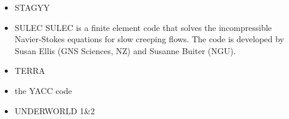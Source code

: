 \begin{itemize}
\cite{full95}
\cite{wibe94}
\cite{befh94}
\cite{full95}
\cite{elfb95}
\cite{bekh96}
\cite{will99}
\cite{pybf00}
\cite{bemh00}
\cite{bejn01}
\cite{hube02}
\cite{pybf02}
\cite{hube03}
\cite{vamf03}
\cite{wipo03}
\cite{pymi03}
\cite{bejn04}
\cite{pycr04}
\cite{pybe04}
\cite{elsp04}
\cite{geim04}
\cite{gebi05}
\cite{hubb05}
\cite{pysk06}
\cite{selz06}
\cite{hube07}
\cite{cubh07}
\cite{mohb07}
\cite{sebp08}
\cite{wabj08}
\cite{wabj08b}
\cite{kecw09}
\cite{bejb09}
\cite{bupb09}
\cite{grba09}
\cite{sihb09}
\cite{albs10}
\cite{albe10}
\cite{grpy10}
\cite{pygp10}
\cite{cube11}
\cite{bubj11}
\cite{hube11}
\cite{grpy12}
\cite{grpy12b}
\cite{kogp12}
\cite{grbe12}
\cite{jahu12}
\cite{bubj13}
\cite{chbe13}
\cite{fihv13a}
\cite{fihv13b}
\cite{gobi13}
\cite{grpy13}
\cite{knak13}
\cite{nipc13}
\cite{jahm13}
\cite{gogu14}
\cite{albe15}
\cite{bubj15}
\cite{heps15}
\cite{licu16}
\cite{bube17}


\item STAGYY
\cite{rota11}
\cite{yadl14}
\cite{crta14}

\item SULEC
SULEC is a finite element code that solves the incompressible Navier-Stokes equations 
for slow creeping flows. The code is developed by Susan Ellis 
(GNS Sciences, NZ) and Susanne Buiter (NGU). 

\cite{qube11}
\cite{ellw11}
\cite{buit12}
\cite{tebu12} 
\cite{crsg12}
\cite{grel12}
\cite{ghbu13}
\cite{ghbu14}
\cite{qubu14}
\cite{qubt14} 
\cite{nabu15}
\cite{zwsn16}
\cite{tebu17}










\item TERRA
\cite{burb97}
\cite{burl98}
\cite{phbs09}
\cite{wodd09}
\cite{woda11}
\cite{dadb13}
\cite{vade16}



\item the YACC code

\cite{tosn15}
\cite{tomy16}


\item UNDERWORLD 1\&2
\cite{stfs06}
\cite{moql07} 
\cite{stfs07}
\cite{lemm08}
\cite{ozrl08}
\cite{casm10}
\cite{mamb10}
\cite{stsf10}
\cite{stfc10}
\cite{fasm10}
\cite{cafz11}
\cite{cafa12}
\cite{bemm13}
\cite{scmo13}
\cite{faca13}
\cite{famc14}
\cite{quxm15}
\cite{bemm15}
\cite{scsp15}
\cite{shmj15}
\cite{shmv16}
\cite{onlw16}
\cite{kicf16}
\cite{memm18}



\end{itemize}

